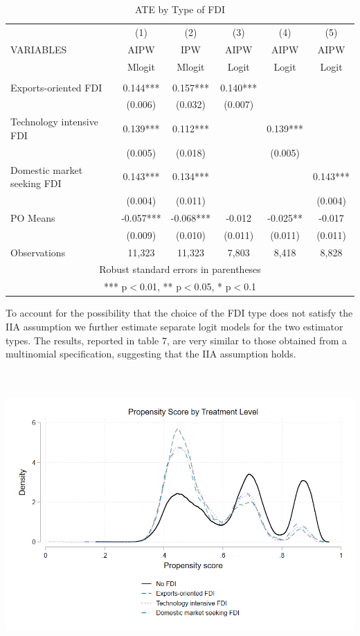 \documentclass[a4paper,11pt]{scrartcl}
\begin{document}
\begin{table}[htbp]\centering
\caption{ATE by Type of FDI}
\begin{tabular}{lccccc} \hline
 & (1) & (2) & (3) & (4) & (5) \\
VARIABLES & AIPW & IPW  & AIPW  & AIPW & AIPW \\ 
&Mlogit&Mlogit&Logit&Logit&Logit\\
\hline
 &  &  &  &  &   \\
Exports-oriented FDI & 0.144*** &   0.157*** & 0.140*** &  &  \\
 & (0.006) &   (0.032) & (0.007) &  &\\
Technology intensive FDI & 0.139***   & 0.112*** &  & 0.139*** &   \\
 & (0.005)  & (0.018) &  &  (0.005)&  \\
Domestic market seeking FDI & 0.143*** &   0.134*** &  &  &0.143*** \\
 & (0.004)   & (0.011) &  &  & (0.004)  \\
PO Means &   -0.057*** &   -0.068*** &-0.012  &-0.025**  & -0.017    \\
 &   (0.009) &   (0.010) &  (0.011)&(0.011)  & (0.011) \\
 Observations & 11,323  & 11,323 &  7,803  & 8,418 & 8,828  \\ \hline
\multicolumn{6}{c}{ Robust standard errors in parentheses} \\
\multicolumn{6}{c}{ *** p$<$0.01, ** p$<$0.05, * p$<$0.1} \\
\end{tabular}
\end{table}

To account for the possibility that the choice of the FDI type does not satisfy the IIA assumption we further estimate separate logit models for the two estimator types. The results, reported in table 7, are very similar to those obtained from a multinomial specification, suggesting that the IIA assumption holds.  

\includegraphics[height=11cm]{mlog_overl_ppb.png}\\[0.5cm] 
\end{document}
